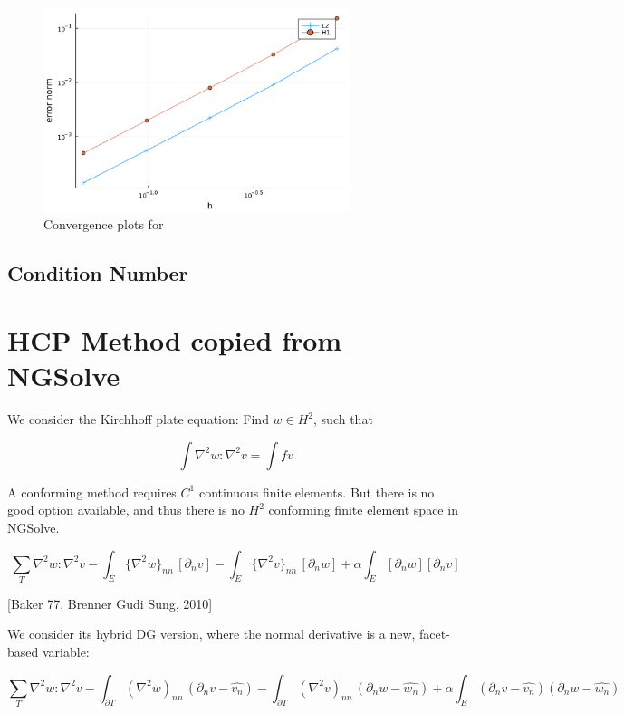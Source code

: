 \begin{figure}[htpb]
    \centering
    \includegraphics[width=0.8\textwidth]{figures/convergence.png}
    \caption{Convergence plots for  }
    \label{Convergence on domain.}
\end{figure}

\subsection{Condition Number}%
\label{sub:condition_number}



\section{HCP Method copied from NGSolve}%
\label{ssub:hc0ip_method_from_ngsolve}

We consider the Kirchhoff plate equation: Find $w \in H^2$, such that

$$
\int \nabla^2 w : \nabla^2 v = \int f v
$$

A conforming method requires $C^1$ continuous finite elements. But there is no good option available, and thus there is no $H^2$ conforming finite element space in NGSolve.

$$
\sum_T \nabla^2 w : \nabla^2 v
- \int_{E} \{\nabla^2 w\}_{nn} \, [\partial_n v]
- \int_{E} \{\nabla^2 v\}_{nn} \, [\partial_n w] + \alpha \int_E  [\partial_n w]  [\partial_n v]
$$

[Baker 77, Brenner Gudi Sung, 2010]

We consider its hybrid DG version, where the normal derivative is a new, facet-based variable:


$$
\sum_T \nabla^2 w : \nabla^2 v
- \int_{\partial T} (\nabla^2 w)_{nn} \, (\partial_n v - \widehat{v_n})
- \int_{\partial T} (\nabla^2 v)_{nn} \, (\partial_n w - \widehat{w_n}) + \alpha \int_E (\partial_n v - \widehat{v_n}) (\partial_n w - \widehat{w_n})
$$




